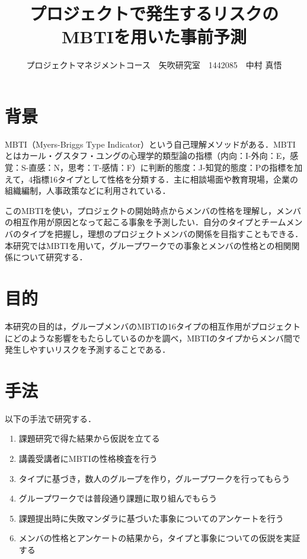 \documentclass[uplatex,twocolumn,dvipdfmx]{jsarticle}
\title{\vspace{-5mm}\fontsize{14pt}{0pt}\selectfont プロジェクトで発生するリスクのMBTIを用いた事前予測}
\author{\normalsize プロジェクトマネジメントコース　矢吹研究室　1442085　中村 真悟}
\date{}
\begin{document}
\fontsize{10.5pt}{\baselineskip}\selectfont
\maketitle






\section{背景}
MBTI（Myers-Briggs Type Indicator）という自己理解メソッドがある．MBTIとはカール・グスタフ・ユングの心理学的類型論の指標（内向：I-外向：E，感覚：S-直感：N，思考：T-感情：F）に判断的態度：J-知覚的態度：Pの指標を加えて，4指標16タイプとして性格を分類する．主に相談場面や教育現場，企業の組織編制，人事政策などに利用されている\cite{110001230195}．

このMBTIを使い，プロジェクトの開始時点からメンバの性格を理解し，メンバの相互作用が原因となって起こる事象を予測したい．自分のタイプとチームメンバのタイプを把握し，理想のプロジェクトメンバの関係を目指すこともできる．本研究ではMBTIを用いて，グループワークでの事象とメンバの性格との相関関係について研究する．

\section{目的}
本研究の目的は，グループメンバのMBTIの16タイプの相互作用がプロジェクトにどのような影響をもたらしているのかを調べ，MBTIのタイプからメンバ間で発生しやすいリスクを予測することである．

\section{手法}
以下の手法で研究する．
\begin{enumerate}
\item 課題研究で得た結果から仮説を立てる
\item 講義受講者にMBTIの性格検査\cite{MBTI}を行う
\item タイプに基づき，数人のグループを作り，グループワークを行ってもらう
\item グループワークでは普段通り課題に取り組んでもらう
\item 課題提出時に失敗マンダラ\cite{110009915588}に基づいた事象についてのアンケートを行う
\item メンバの性格とアンケートの結果から，タイプと事象についての仮説を実証する
\end{enumerate}
\end{document}
